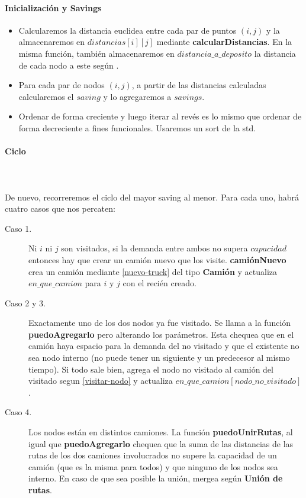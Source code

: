 \paragraph{Inicialización y Savings}

\begin{itemize}
	\item Calcularemos la distancia euclidea entre cada par de puntos $(i,j)$ y la almacenaremos en $distancias[i][j]$ mediante \textbf{calcularDistancias}. En la misma función, también almacenaremos en $distancia\_a\_deposito$ la distancia de cada nodo a este según .
	\item Para cada par de nodos $(i,j)$, a partir de las distancias calculadas calcularemos el $saving$ y lo agregaremos a $savings$.  
	\item Ordenar de forma creciente y luego iterar al revés es lo mismo que ordenar de forma decreciente a fines funcionales. Usaremos un sort de la std.
\end{itemize}

\paragraph{Ciclo}\hspace{0pt} \\
\\
De nuevo, recorreremos el ciclo del mayor saving al menor. Para cada uno, habrá cuatro casos que nos percaten:
\begin{description}
	\item[Caso 1.] Ni $i$ ni $j$ son visitados, si la demanda entre ambos no supera $capacidad$ entonces hay que crear un camión nuevo que los visite.  \textbf{camiónNuevo} crea un camión mediante  \ref{nuevo-truck} del tipo \textbf{Camión} y actualiza $en\_que\_camion$ para $i$ y $j$ con el recién creado.
	\item[Caso 2 y 3.] Exactamente uno de los dos nodos ya fue visitado. Se llama a la función \textbf{puedoAgregarlo} pero alterando los parámetros. Esta chequea que en el camión haya espacio para la demanda del no visitado y que el existente no sea nodo interno (no puede tener un siguiente y un predecesor al mismo tiempo). Si todo sale bien, agrega el nodo no visitado al camión del visitado segun \ref{visitar-nodo} y actualiza $en\_que\_camion[nodo\_no\_visitado]$.
	\item[Caso 4.] Los nodos están en distintos camiones. La función \textbf{puedoUnirRutas}, al igual que \textbf{puedoAgregarlo} chequea que la suma de las distancias de las rutas de los dos camiones involucrados no supere la capacidad de un camión (que es la misma para todos) y que ninguno de los nodos sea interno. En caso de que sea posible la unión, mergea según \textbf{Unión de rutas}.
\end{description}

